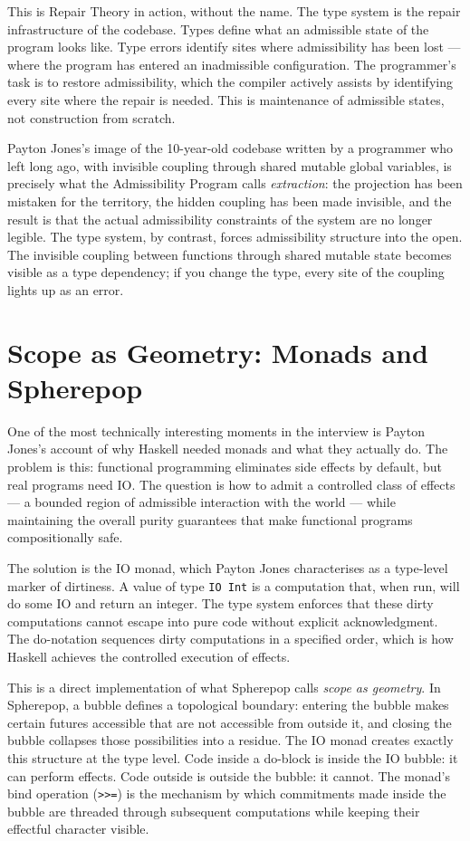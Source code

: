 \documentclass[12pt]{article}
\begin{document}
This is Repair Theory in action, without the name. The type system is the repair
infrastructure of the codebase. Types define what an admissible state of the
program looks like. Type errors identify sites where admissibility has been
lost — where the program has entered an inadmissible configuration. The
programmer's task is to restore admissibility, which the compiler actively
assists by identifying every site where the repair is needed. This is
maintenance of admissible states, not construction from scratch.

Payton Jones's image of the 10-year-old codebase written by a programmer who
left long ago, with invisible coupling through shared mutable global variables,
is precisely what the Admissibility Program calls \emph{extraction}: the
projection has been mistaken for the territory, the hidden coupling has been
made invisible, and the result is that the actual admissibility constraints
of the system are no longer legible. The type system, by contrast, forces
admissibility structure into the open. The invisible coupling between functions
through shared mutable state becomes visible as a type dependency; if you change
the type, every site of the coupling lights up as an error.

\section{Scope as Geometry: Monads and Spherepop}

One of the most technically interesting moments in the interview is Payton
Jones's account of why Haskell needed monads and what they actually do. The
problem is this: functional programming eliminates side effects by default, but
real programs need IO. The question is how to admit a controlled class of
effects — a bounded region of admissible interaction with the world — while
maintaining the overall purity guarantees that make functional programs
compositionally safe.

The solution is the IO monad, which Payton Jones characterises as a type-level
marker of dirtiness. A value of type \texttt{IO Int} is a computation that,
when run, will do some IO and return an integer. The type system enforces that
these dirty computations cannot escape into pure code without explicit
acknowledgment. The do-notation sequences dirty computations in a specified
order, which is how Haskell achieves the controlled execution of effects.

This is a direct implementation of what Spherepop calls \emph{scope as
geometry}. In Spherepop, a bubble defines a topological boundary: entering the
bubble makes certain futures accessible that are not accessible from outside it,
and closing the bubble collapses those possibilities into a residue. The IO
monad creates exactly this structure at the type level. Code inside a do-block
is inside the IO bubble: it can perform effects. Code outside is outside the
bubble: it cannot. The monad's bind operation (\texttt{>>=}) is the mechanism
by which commitments made inside the bubble are threaded through subsequent
computations while keeping their effectful character visible.
\end{document}
